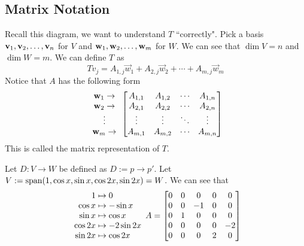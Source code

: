 \subsection{Matrix Notation}
\begin{center}
\end{center}
Recall this diagram, we want to understand $T$ ``correctly". Pick a basis ${\mathbf v}_1,{\mathbf v}_2, \ldots, {\mathbf v}_{n}$ for $V$ and ${\mathbf w}_1,{\mathbf w}_2, \ldots, {\mathbf w}_{m}$ for $W$. We can see that $\dim V = n$ and $\dim W = m$. We can define $T$ as
\[Tv_j = A_{1,j} \vec w_1 + A_{2,j} \vec w_2 + \cdots + A_{m,j} \vec w_m \]
Notice that $A$ has the following form
\[ \begin{array}{cc}
     \mathbf w_1 \to \\
     \mathbf w_2 \to \\
     \vdots \\
     \mathbf w_m \to
\end{array}\begin{bmatrix} A_{1,1} & A_{1,2} & \cdots & A_{1,n} \\ 
A_{2,1} & A_{2,2} & \cdots & A_{2,n} \\
\vdots & \vdots & \ddots & \vdots \\ 
A_{m,1} & A_{m,2} & \cdots & A_{m,n} \end{bmatrix}\]
This is called the matrix representation of $T$.
\begin{example}
    Let $D: V \to W$ be defined as $D := p \to p'$. Let $V:= \text{span} (1, \cos x, \sin x, \cos 2x, \sin 2x) = W$. We can see that 
    \[\begin{array}{rl}
         1 &\hspace{-0.25cm}\mapsto 0 \\ \cos x &\hspace{-0.25cm}\mapsto -\sin x \\ \sin x &\hspace{-0.25cm}\mapsto \cos x \\ \cos 2x &\hspace{-0.25cm}\mapsto -2 \sin 2x \\ \sin 2x &\hspace{-0.25cm}\mapsto \cos 2x
    \end{array} A = \bml 0 & 0 & 0 & 0 & 0 \\ 
               0 & 0 & -1 & 0 & 0 \\
               0 & 1 & 0 & 0 & 0 \\
               0 & 0 & 0 & 0 & -2 \\
               0 & 0 & 0 & 2 & 0 \bmr\]
\end{example}
